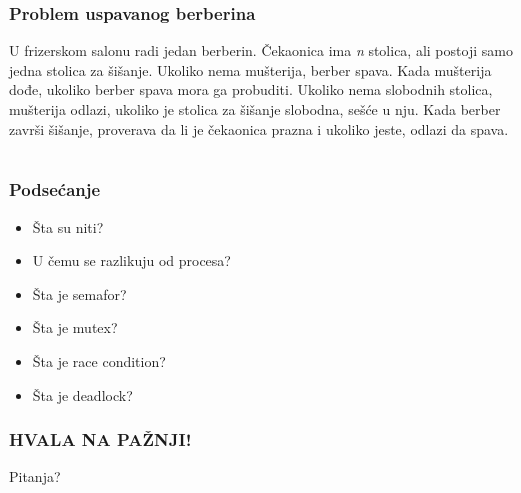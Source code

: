 \documentclass{beamer}
\begin{document}
\begin{frame}
    \frametitle{Problem uspavanog berberina}
    \begin{center}
        U frizerskom salonu radi jedan berberin. Čekaonica ima \textit{n} stolica, ali postoji samo jedna stolica za šišanje. Ukoliko nema mušterija, berber spava. Kada mušterija dođe, ukoliko berber spava mora ga probuditi. Ukoliko nema slobodnih stolica, mušterija odlazi, ukoliko je stolica za šišanje slobodna, sešće u nju. Kada berber završi šišanje, proverava da li je čekaonica prazna i ukoliko jeste, odlazi da spava.
    \end{center}
\end{frame}

\section*{}
\subsection*{}
\begin{frame}
    \frametitle{Podsećanje}
    \begin{itemize}
        \item Šta su niti? \newline
        \item U čemu se razlikuju od procesa? \newline
        \item Šta je semafor? \newline
        \item Šta je mutex? \newline
        \item Šta je race condition? \newline
        \item Šta je deadlock?
    \end{itemize}

    

\end{frame}

\begin{frame}
    \frametitle{HVALA NA PAŽNJI!}
    \begin{center}
        \Huge Pitanja?    
    \end{center}
\end{frame}
\end{document}
